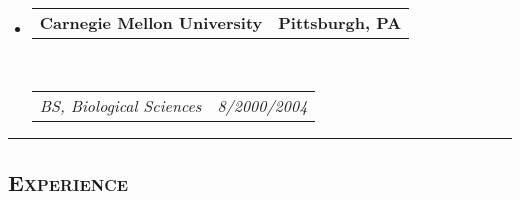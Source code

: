 \documentclass[12pt,letterpaper,oneside]{article}
\makeatletter
\newcommand{\headerrow}[2]
{\begin{tabular*}{\linewidth}{l@{\extracolsep{\fill}}r}
	#1 &
	#2 \\
\end{tabular*}}
\makeatother
\begin{document}
\begin{itemize}
	\parskip=0.1em

	\item 
	\headerrow
		{\textbf{Carnegie Mellon University}}
		{\textbf{Pittsburgh, PA}}
	\\
	\headerrow
		{\emph{BS, Biological Sciences}}
		{\emph{8/2000\textendash 5/2004}}
	\vspace{-6mm}		
\end{itemize}


\hrule
\vspace{-0.4em}
\subsection*{\centering\textsc{Experience}}
\end{document}
